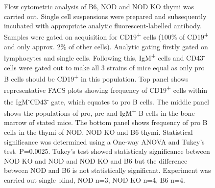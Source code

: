 \begin{figure}
{Flow cytometric analysis of B6, NOD and NOD KO thymi was carried out.
Single cell suspensions were prepared and subsequently incubated with appropriate analytic fluorescent-labelled antibody.
Samples were gated on acquisition for CD19\textsuperscript{+} cells (100\% of CD19\textsuperscript{+} and only approx. 2\% of other cells).
Analytic gating firstly gated on lymphocytes and single cells.
Following this, IgM\textsuperscript{+} cells and CD43\textsuperscript{-} cells were gated out to make all 3 strains of mice equal as only pro B cells should be CD19\textsuperscript{+} in this population. 
Top panel shows representative FACS plots showing frequency of CD19\textsuperscript{+} cells within the IgM\textsuperscript{-}CD43\textsuperscript{-} gate, which equates to pro B cells.
The middle panel shows the populations of pro, pre and IgM\textsuperscript{+} B cells in the bone marrow of stated mice.
The bottom panel shows frequency of pro B cells in the thymi of NOD, NOD KO and B6 thymi.
Statistical significance was determined using a One-way ANOVA and Tukey's test. P=0.0025. Tukey's test showed statisticaly significance between NOD KO and NOD and NOD KO and B6 but the difference between NOD and B6 is not statistically significant.
Experiment was carried out single blind, NOD n=3, NOD KO n=4, B6 n=4.}
\label{fig:MatureBincProB}
\end{figure}




